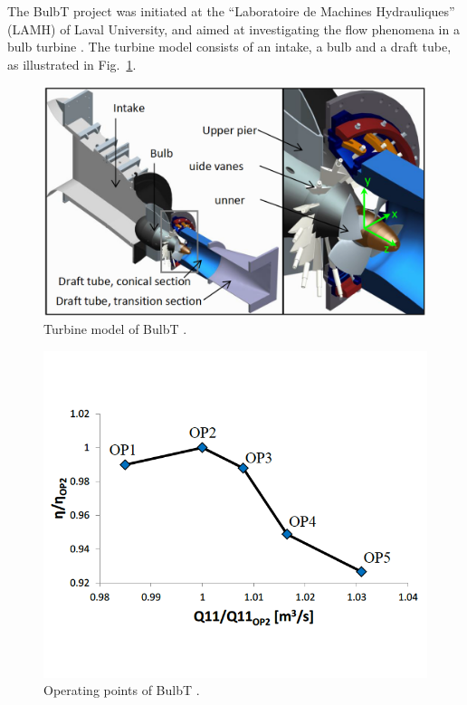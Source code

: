 The BulbT project was initiated at the ``Laboratoire de Machines Hydrauliques'' (LAMH) of Laval University, and aimed at investigating the flow phenomena in a bulb turbine \cite{vu2014cfd}. The turbine model consists of an intake, a bulb and a draft tube, as illustrated in Fig.~\ref{bulbt}. 
\begin{figure}[t]  
\centering
     \includegraphics[clip=true, trim= 0.0cm 0.0cm 0.0cm 0.0cm,width=0.99\linewidth]{./figures/bulbt/bulbt}                            
     \caption{Turbine model of BulbT \cite{vuillemard2014experimental}.}
     \label{bulbt}
\end{figure} 
\begin{figure}[t] 
\centering
     \includegraphics[clip=true, trim= 0.0cm 3.0cm 0.0cm 3.0cm,width=0.99\linewidth]{./figures/bulbt/bulbt-op}                  
     \caption{Operating points of BulbT \cite{vuillemard2014experimental}.}
     \label{bulbt-op}
\end{figure}

